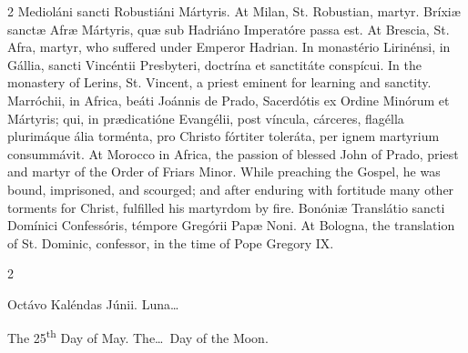\begin{paracol}{2}
\switchcolumn*
{}
Medioláni sancti 
 Robustiáni Mártyris.
\switchcolumn
{}
At Milan, St. Robustian, martyr.
\switchcolumn*
{}
Bríxiæ sanctæ Afræ 
 Mártyris, quæ sub Hadriáno Imperatóre passa est.
\switchcolumn
{}
At Brescia, St. Afra, martyr, who 
 suffered under Emperor Hadrian.
\switchcolumn*
{}
In monastério 
 Lirinénsi, in Gállia, sancti Vincéntii Presbyteri, doctrína et sanctitáte 
 conspícui.
\switchcolumn
{}
In the monastery of Lerins, St. 
 Vincent, a priest eminent for learning and sanctity.
\switchcolumn*
{}
Marróchii, in Africa, 
 beáti Joánnis de Prado, Sacerdótis ex Ordine Minórum et Mártyris; qui, in 
 prædicatióne Evangélii, post víncula, cárceres, flagélla plurimáque ália 
 torménta, pro Christo fórtiter toleráta, per ignem martyrium consummávit.
\switchcolumn
{}
At Morocco in Africa, the passion 
 of blessed John of Prado, priest and martyr of the Order of Friars Minor. 
 While preaching the Gospel, he was bound, imprisoned, and scourged; and 
 after enduring with fortitude many other torments for Christ, fulfilled his 
 martyrdom by fire.
\switchcolumn*
{}
Bonóniæ Translátio 
 sancti Domínici Confessóris, témpore Gregórii Papæ Noni.
\switchcolumn
{}
At Bologna, the translation of St. 
 Dominic, confessor, in the time of Pope Gregory IX.
\switchcolumn*
{}
\end{paracol}


\begin{paracol}{2}
\begin{center}{\color{gregoriocolor} Octávo Kaléndas Júnii. 
 Luna\dots\ }\end{center}
\switchcolumn
{}
\begin{center}{\color{gregoriocolor} The 
 25\textsuperscript{th} Day of May. The\dots\ Day of the Moon.}\end{center}
\end{paracol}

